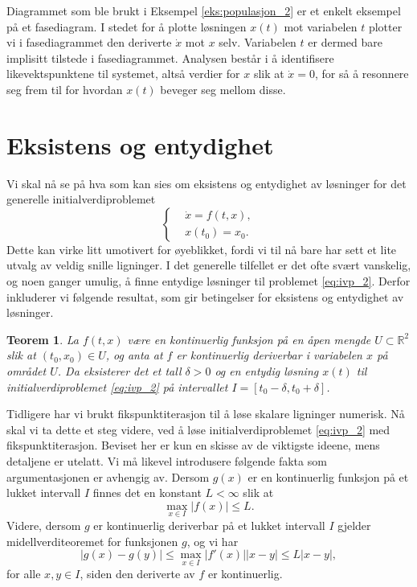 \documentclass{article}
\theoremstyle{plain}
\newtheorem{thm}{Teorem}\surroundwithmdframed{thm}
\theoremstyle{definition}
\theoremstyle{remark}
\newcommand{\fcn}{x}
\newcommand{\abs}[1]{|#1|}
\newcommand{\bigabs}[1]{\big|#1\big|}
\begin{document}
Diagrammet som ble brukt i Eksempel \ref{eks:populasjon_2} er et enkelt eksempel på et fasediagram. I stedet for å plotte løsningen $\fcn(t)$ mot variabelen $t$ plotter vi i fasediagrammet den deriverte $\dot{\fcn}$ mot $\fcn$ selv. Variabelen $t$ er dermed bare implisitt tilstede i fasediagrammet. Analysen består i å identifisere likevektspunktene til systemet, altså verdier for $\fcn$ slik at $\dot{\fcn} = 0$, for så å resonnere seg frem til for hvordan $\fcn(t)$ beveger seg mellom disse.


\section*{Eksistens og entydighet}

Vi skal nå se på hva som kan sies om eksistens og entydighet av løsninger for det generelle initialverdiproblemet
\begin{equation} \label{eq:ivp_2}
    \left\{
    \begin{aligned}
         & \dot{\fcn} = f(t, \fcn), \\
         & \fcn(t_0) = \fcn_0.
    \end{aligned}
    \right.
\end{equation}
Dette kan virke litt umotivert for øyeblikket, fordi vi til nå bare har sett et lite utvalg av veldig snille ligninger. I det generelle tilfellet er det ofte svært vanskelig, og noen ganger umulig, å finne entydige løsninger til problemet \eqref{eq:ivp_2}. Derfor inkluderer vi følgende resultat, som gir betingelser for eksistens og entydighet av løsninger.

\begin{thm} \label{thm:eksistens_unikhet}
    La $f(t, x)$ være en kontinuerlig funksjon på en åpen mengde $U \subset \mathbb{R}^2$ slik at $(t_0, x_0) \in U$, og anta at $f$ er kontinuerlig deriverbar i variabelen $x$ på området $U$. Da eksisterer det et tall $\delta > 0$ og en entydig løsning $x(t)$ til initialverdiproblemet \eqref{eq:ivp_2} på intervallet ${I = [t_0 - \delta, t_0 + \delta]}$.
\end{thm}

Tidligere har vi brukt fikspunktiterasjon til å løse skalare ligninger numerisk. Nå skal vi ta dette et steg videre, ved å løse initialverdiproblemet \eqref{eq:ivp_2} med fikspunktiterasjon. Beviset her er kun en skisse av de viktigste ideene, mens detaljene er utelatt. Vi må likevel introdusere følgende fakta som argumentasjonen er avhengig av. Dersom $g(x)$ er en kontinuerlig funksjon på et lukket intervall $I$ finnes det en konstant $L < \infty$ slik at
\begin{equation*}
    \max_{x \in I} \abs{f(x)} \leq L.
\end{equation*}
Videre, dersom $g$ er kontinuerlig deriverbar på et lukket intervall $I$ gjelder midellverditeoremet for funksjonen $g$, og vi har
\begin{equation} \label{eq:lip}
        \abs{g(x) - g(y)} \leq \max_{x \in I} \bigabs{f'(x)} \abs{x-y} \leq L \abs{x-y},
\end{equation}
for alle $x, y \in I$, siden den deriverte av $f$ er kontinuerlig.
\end{document}
